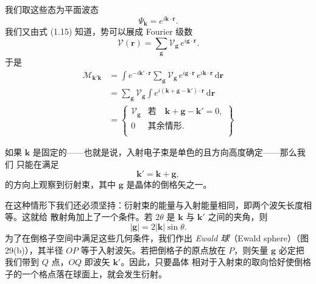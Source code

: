 我们取这些态为平面波态
\begin{equation*}
\Psi_{\mathbf{k}} = e^{i\mathbf{k}\cdot\mathbf{r}}.
\tag{2.76}
\end{equation*}
我们又由式 (1.15) 知道，势可以展成 Fourier 级数
\begin{equation*}
\mathcal{V}(\mathbf{r}) = \sum_{\mathbf{g}} \mathcal{V}_{\mathbf{g}}\,
e^{i\mathbf{g}\cdot\mathbf{r}}.
\tag{2.77}
\end{equation*}
于是
\begin{align*}
\mathcal{M}_{\mathbf{k}'\mathbf{k}}
&= \int e^{-i\mathbf{k}'\cdot\mathbf{r}} \sum_{\mathbf{g}}
\mathcal{V}_{\mathbf{g}}\, e^{i\mathbf{g}\cdot\mathbf{r}}\,
e^{i\mathbf{k}\cdot\mathbf{r}}\, \mathrm{d}\mathbf{r} \\
&= \sum_{\mathbf{g}} \mathcal{V}_{\mathbf{g}} \int
e^{i(\mathbf{k}+\mathbf{g}-\mathbf{k}')\cdot\mathbf{r}}\, \mathrm{d}\mathbf{r} \\
&= \left\{ \begin{array}{ll}
\mathcal{V}_{\mathbf{g}} & \text{若}\quad \mathbf{k}+\mathbf{g}-\mathbf{k}' = 0, \\
0 & \text{其余情形}. \\
\end{array} \right\}
\tag{2.78}
\end{align*}

如果 $\mathbf{k}$ 是固定的——也就是说，入射电子束是单色的且方向高度确定——那么我们
只能在满足
\begin{equation*}
\mathbf{k}' = \mathbf{k} + \mathbf{g},
\tag{2.79}
\end{equation*}
的方向上观察到衍射束，其中 $\mathbf{g}$
是晶体的倒格矢之一。

在这种情形下我们还必须坚持：衍射束的能量与入射能量相同，即两个波矢长度相等。这就给
散射角加上了一个条件。若 $2\theta$ 是 $\mathbf{k}$ 与 $\mathbf{k}'$
之间的夹角，则
\begin{equation*}
|\mathbf{g}| = 2|\mathbf{k}|\sin\theta.
\tag{2.80}
\end{equation*}
为了在倒格子空间中满足这些几何条件，我们作出 \emph{Ewald 球}（Ewald
sphere）（图 29(b)），其半径 $OP$ 等于入射波矢。若把倒格子的原点放在 $P$，则矢量
$\mathbf{g}$ 必定把我们带到 $Q$ 点，$OQ$ 即波矢 $\mathbf{k}'$。因此，只要晶体
相对于入射束的取向恰好使倒格子的一个格点落在球面上，就会发生衍射。

